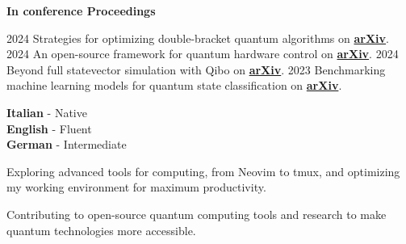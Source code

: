 \documentclass[9pt]{developercv} %
\begin{document}
\textbf{In conference Proceedings} \\

\begin{entrylist}

    \entry
        {2024}
        {Strategies for optimizing double-bracket quantum algorithms}
        {}
        {on \href{https://arxiv.org/abs/2408.07431}{\textbf{arXiv}}.} 
    \entry
        {2024}
        {An open-source framework for quantum hardware control}
        {}
        {on \href{https://arxiv.org/abs/2407.21737}{\textbf{arXiv}}.} 
    \entry
        {2024}
        {Beyond full statevector simulation with Qibo}
        {}
        {on \href{https://arxiv.org/abs/2408.00384}{\textbf{arXiv}}.} 
    \entry
        {2023}
        {Benchmarking machine learning models for quantum state classification}
        {}
        {on \href{https://arxiv.org/abs/2309.07679}{\textbf{arXiv}}.} 

\end{entrylist}

\begin{minipage}[t]{0.3\textwidth} %
	\vspace{-\baselineskip} %

	
	\textbf{Italian} - Native\\
	\textbf{English} - Fluent\\
	\textbf{German} - Intermediate
\end{minipage}
\hfill %
\begin{minipage}[t]{0.3\textwidth} %
	\vspace{-\baselineskip} %
	
	
	Exploring advanced tools for computing, from Neovim to tmux, and optimizing my working environment for maximum productivity.
\end{minipage}
\hfill %
\begin{minipage}[t]{0.3\textwidth} %
	\vspace{-\baselineskip} %
	
	
	Contributing to open-source quantum computing tools and research to make quantum technologies more accessible.
\end{minipage}

\end{document}
